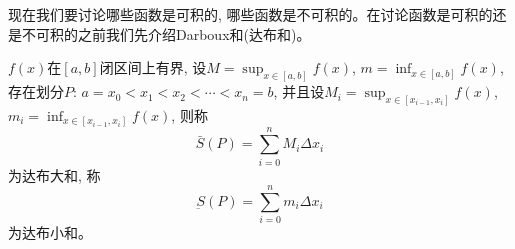 现在我们要讨论哪些函数是可积的, 哪些函数是不可积的。在讨论函数是可积的还是不可积的之前我们先介绍Darboux和(达布和)。
\begin{definition}
    $f(x)$在$[a, b]$闭区间上有界, 设$M=\sup_{x\in [a, b]} f(x)$, $m=\inf_{x\in [a, b]} f(x)$, 存在划分$P$: $a = x_0 < x_1 < x_2 < \cdots < x_n = b$, 并且设$M_i = \sup_{x\in [x_{i-1}, x_i]} f(x)$, $m_i=\inf_{x\in [x_{i-1}, x_i]} f(x)$, 则称
    \begin{equation*}
        \bar{S}(P) = \sum_{i=0}^n M_i\Delta x_i
    \end{equation*}
    为达布大和, 称
    \begin{equation*}
        \underbar{S}(P) = \sum_{i=0}^n m_i\Delta x_i
    \end{equation*}
    为达布小和。
\end{definition}